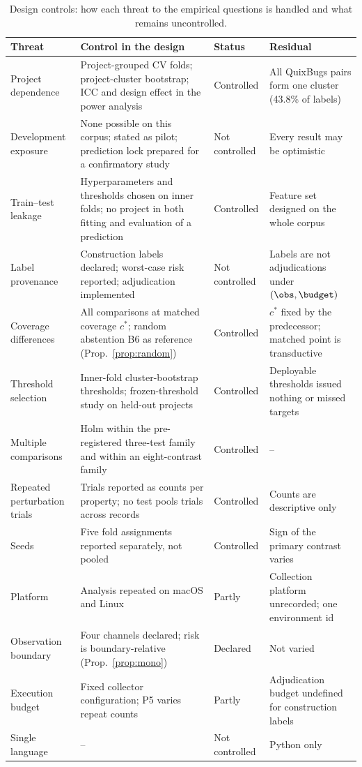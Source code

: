 \begin{table}[!t]
\caption{Design controls: how each threat to the empirical questions is handled and what remains uncontrolled.}
\label{tab:controls}
\centering
\scriptsize
\setlength{\tabcolsep}{3pt}
\renewcommand{\arraystretch}{1.08}
\begin{tabular}{|L{2.6cm}|L{6.4cm}|L{1.7cm}|L{4.9cm}|}
\hline
Threat & Control in the design & Status & Residual \\
\hline
Project dependence & Project-grouped CV folds; project-cluster bootstrap; ICC and design effect in the power analysis & Controlled & All QuixBugs pairs form one cluster (43.8\% of labels) \\
Development exposure & None possible on this corpus; stated as pilot; prediction lock prepared for a confirmatory study & Not controlled & Every result may be optimistic \\
Train--test leakage & Hyperparameters and thresholds chosen on inner folds; no project in both fitting and evaluation of a prediction & Controlled & Feature set designed on the whole corpus \\
Label provenance & Construction labels declared; worst-case risk reported; adjudication implemented & Not controlled & Labels are not adjudications under $(\obs,\budget)$ \\
Coverage differences & All comparisons at matched coverage $c^\ast$; random abstention B6 as reference (Prop.~\ref{prop:random}) & Controlled & $c^\ast$ fixed by the predecessor; matched point is transductive \\
Threshold selection & Inner-fold cluster-bootstrap thresholds; frozen-threshold study on held-out projects & Controlled & Deployable thresholds issued nothing or missed targets \\
Multiple comparisons & Holm within the pre-registered three-test family and within an eight-contrast family & Controlled & -- \\
Repeated perturbation trials & Trials reported as counts per property; no test pools trials across records & Controlled & Counts are descriptive only \\
Seeds & Five fold assignments reported separately, not pooled & Controlled & Sign of the primary contrast varies \\
Platform & Analysis repeated on macOS and Linux & Partly & Collection platform unrecorded; one environment id \\
Observation boundary & Four channels declared; risk is boundary-relative (Prop.~\ref{prop:mono}) & Declared & Not varied \\
Execution budget & Fixed collector configuration; P5 varies repeat counts & Partly & Adjudication budget undefined for construction labels \\
Single language & -- & Not controlled & Python only \\
\hline
\end{tabular}
\end{table}

